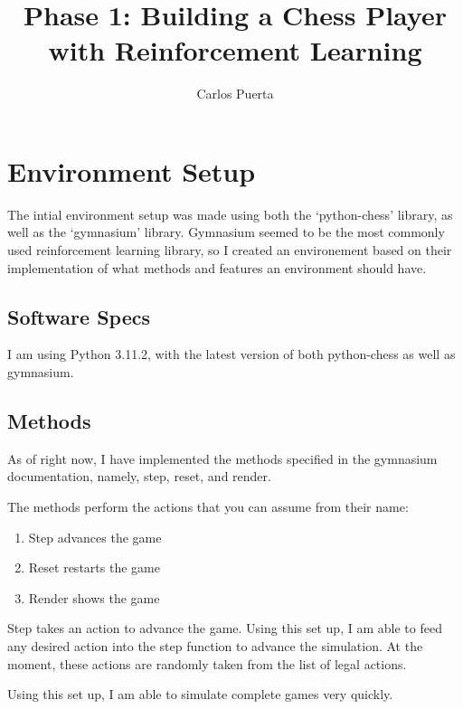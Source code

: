 \documentclass[12pt]{article}
\title{Phase 1: Building a Chess Player with Reinforcement Learning}
\author{Carlos Puerta}
\begin{document}
\maketitle

\section{Environment Setup}
The intial environment setup was made using both the `python-chess' library, as well as the `gymnasium' library. Gymnasium seemed to be the most commonly used reinforcement learning library, so I created an environement based on their implementation of what methods and features an environment should have.

\subsection{Software Specs}
I am using Python 3.11.2, with the latest version of both python-chess as well as gymnasium. 

\subsection{Methods}
As of right now, I have implemented the methods specified in the gymnasium documentation, namely, step, reset, and render. 

The methods perform the actions that you can assume from their name: 
\begin{enumerate}
    \item Step advances the game
    \item Reset restarts the game
    \item Render shows the game
\end{enumerate}

Step takes an action to advance the game. Using this set up, I am able to feed any desired action into the step function to advance the simulation. At the moment, these actions are randomly taken from the list of legal actions.

Using this set up, I am able to simulate complete games very quickly.
\end{document}
